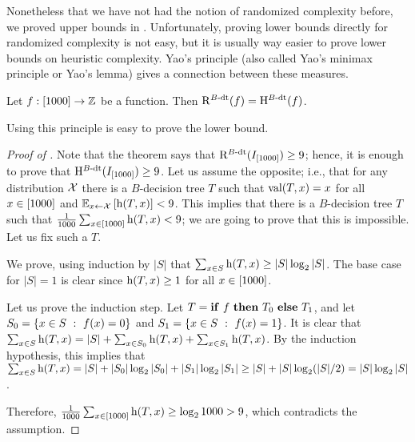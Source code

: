 Nonetheless that we have not had the notion of randomized complexity before, we
proved upper bounds in . Unfortunately, proving lower
bounds directly for randomized complexity is not easy, but it is usually way
easier to prove lower bounds on heuristic complexity. Yao's principle (also
called Yao's minimax principle or Yao's lemma) gives a connection between these
measures.
\begin{theorem}
\label{theorem:yaos-principle}
  Let $f : [1000] \to {\mathbb{Z}}$ be a function. Then $\mathrm{R}^{B\text{-}\mathrm{dt}}({f}) = 
  \mathrm{H}_{ }^{B\text{-}\mathrm{dt}}({f})$.
\end{theorem}


Using this principle is easy to prove the lower bound.
\begin{proof}[Proof of ]
  Note that the theorem says that $\mathrm{R}^{B\text{-}\mathrm{dt}}({I_{{[{1000}]}}}) \ge 9$;
  hence, it is enough to prove that $\mathrm{H}_{ }^{B\text{-}\mathrm{dt}}({I_{{[{1000}]}}}) \ge 9$.
  Let us assume the opposite; i.e., that for any distribution $\mathcal{X}$
  there is a $B$-decision tree $T$ such that $\mathrm{val}({T}, {x}) = x$ for all $x \in
  {[{1000}]}$ and $\expectation[x \gets \Distribution{X}]{\DTHeight[x]{T}} <
  9$.
  This implies that there is a $B$-decision tree $T$ such that 
  $\frac{1}{1000} \sum_{x \in \range{1000}} \DTHeight[x]{T} < 9$; we are going to prove that
  this is impossible. Let us fix such a $T$.

  We prove, using induction by $|S|$ that $\sum_{x \in S} \DTHeight[x]{T} \ge
  |S| \log_2 |S|$. The base case for $|S| = 1$ is clear since 
  $\DTHeight[x]{T} \ge 1$ for all $x \in {[{1000}]}$. 
  
  Let us prove the induction step. Let $T = \mathbf{if}~{f}~\mathbf{then}~{T_0}~\mathbf{else}~{T_1}$, and let 
  $S_0 = \set[f(x) = 0]{x \in S}$ and $S_1 = \set[f(x) = 1]{x \in S}$.
  It is clear that $\sum_{x \in S} \DTHeight[x]{T} = |S| + 
  \sum_{x \in S_0} \DTHeight[x]{T} + \sum_{x \in S_1} \DTHeight[x]{T}$. By the
  induction hypothesis, this implies that $\sum_{x \in S} \DTHeight[x]{T} = |S|
  + |S_0| \log_2 |S_0| + |S_1| \log_2 |S_1| \ge |S| + |S| \log_2 (|S| / 2) =
  |S| \log_2 |S|$.

  Therefore, $\frac{1}{1000} \sum_{x \in \range{1000}} \DTHeight[x]{T} \ge
  \log_2 1000 > 9$, which contradicts the assumption.
\end{proof}

